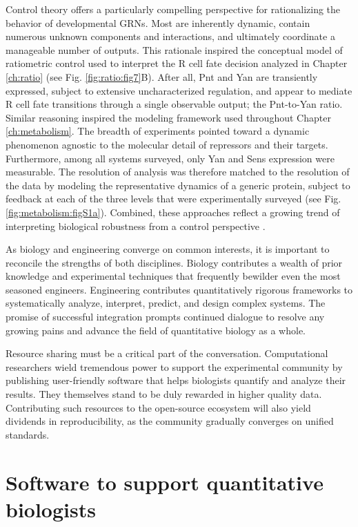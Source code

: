 Control theory offers a particularly compelling perspective for rationalizing the behavior of developmental GRNs. Most are inherently dynamic, contain numerous unknown components and interactions, and ultimately coordinate a manageable number of outputs. This rationale inspired the conceptual model of ratiometric control used to interpret the R cell fate decision analyzed in Chapter \ref{ch:ratio} (see Fig. \ref{fig:ratio:fig7}B). After all, Pnt and Yan are transiently expressed, subject to extensive uncharacterized regulation, and appear to mediate R cell fate transitions through a single observable output; the Pnt-to-Yan ratio. Similar reasoning inspired the modeling framework used throughout Chapter \ref{ch:metabolism}. The breadth of experiments pointed toward a dynamic phenomenon agnostic to the molecular detail of repressors and their targets. Furthermore, among all systems surveyed, only Yan and Sens expression were measurable. The resolution of analysis was therefore matched to the resolution of the data by modeling the representative dynamics of a generic protein, subject to feedback at each of the three levels that were experimentally surveyed (see Fig. \ref{fig:metabolism:figS1a}). Combined, these approaches reflect a growing trend of interpreting biological robustness from a control perspective \cite{Khammash2016}. 

As biology and engineering converge on common interests, it is important to reconcile the strengths of both disciplines. Biology contributes a wealth of prior knowledge and experimental techniques that frequently bewilder even the most seasoned engineers. Engineering contributes quantitatively rigorous frameworks to systematically analyze, interpret, predict, and design complex systems. The promise of successful integration prompts continued dialogue to resolve any growing pains and advance the field of quantitative biology as a whole. 

Resource sharing must be a critical part of the conversation. Computational researchers wield tremendous power to support the experimental community by publishing user-friendly software that helps biologists quantify and analyze their results. They themselves stand to be duly rewarded in higher quality data. Contributing such resources to the open-source ecosystem will also yield dividends in reproducibility, as the community gradually converges on unified standards.

\section{Software to support quantitative biologists}
\label{appendix:software}

